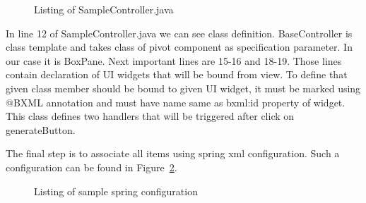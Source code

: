\pagebreak

\begin{figure}[ht]
\centering
 
\caption{Listing of SampleController.java}
\label{fig:sample_controller}
\end{figure} 

In line 12 of SampleController.java we can see class definition. BaseController is class template and takes class of pivot component as specification parameter. In our case it is BoxPane. Next important lines are 15-16 and 18-19. Those lines contain declaration of UI widgets that will be bound from view. To define that given class member should be bound to given UI widget, it must be marked using @BXML annotation and must have name same as bxml:id property of widget. This class defines two handlers that will be triggered after click on generateButton. 

\pagebreak

The final step is to associate all items using spring xml configuration. Such a configuration can be found in Figure~\ref{fig:sample_spring}.

\begin{figure}[ht]
\centering
 
\caption{Listing of sample spring configuration}
\label{fig:sample_spring}
\end{figure}

